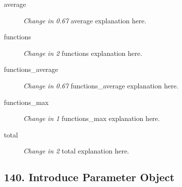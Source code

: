 \begin{enumerate}
            \begin{description}
                  \item [average] \textit{Change in 0.67} average explanation here.
                  \item [functions] \textit{Change in 2} functions explanation here.
                  \item [functions\_average] \textit{Change in 0.67} functions\_average explanation here.
                  \item [functions\_max] \textit{Change in 1} functions\_max explanation here.
                  \item [total] \textit{Change in 2} total explanation here.
            \end{description}
\end{enumerate}
\subsection{ 140.  Introduce Parameter Object }

